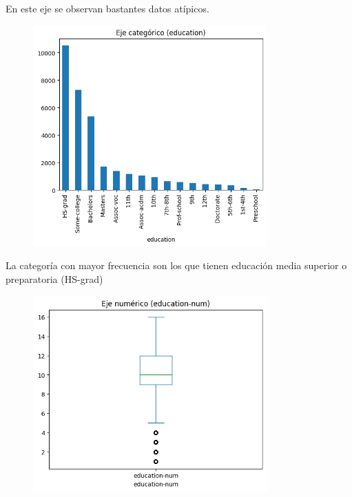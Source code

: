 \documentclass{article}
\begin{document}
	En este eje se observan bastantes datos atípicos.
	\begin{figure}[H]
		\centering
		\includegraphics[width=0.8\textwidth]{education.png}  
	\end{figure}
	La categoría con mayor frecuencia son los que tienen educación media superior o preparatoria (HS-grad)
	\begin{figure}[H]
		\centering
		\includegraphics[width=0.8\textwidth]{education-num.png}  
	\end{figure}
	
\end{document}
